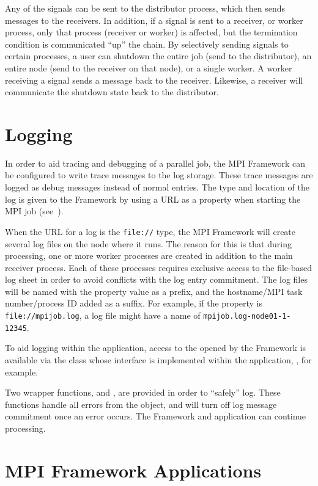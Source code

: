 Any of the signals can be sent to the distributor process, which then sends
messages to the receivers. In addition, if a signal is sent to a receiver, or
worker process, only that process (receiver or worker) is affected, but the
termination condition is communicated ``up'' the chain. By selectively sending
signals to certain processes, a user can shutdown the entire job (send to the
distributor), an entire node (send to the receiver on that node), or a single
worker. A worker receiving a signal sends a message back to the receiver.
Likewise, a receiver will communicate the shutdown state back to the
distributor.

\section{Logging}
\label{sec-mpilogging}
In order to aid tracing and debugging of a parallel job, the MPI Framework
can be configured to write trace messages to the log storage. These trace
messages are logged as debug messages instead of normal entries.
The type and location of the log is given to the 
Framework by using a URL as a property when starting the MPI
job (see~).

When the URL for a log is the {\tt file://} type, the MPI Framework will create
several log files on the node where it runs. The reason for this is that during
 processing, one or more worker processes are created in
addition to the main receiver process. Each of these processes requires
exclusive access to the file-based log sheet in order to avoid conflicts with
the log entry commitment.
The log files will be named with the property value
as a prefix, and the hostname/MPI task number/process ID added as a suffix.
For example, if the property is \verb=file://mpijob.log=, a log file might
have a name of \verb=mpijob.log-node01-1-12345=.

To aid logging within the application, access to the  opened
by the Framework is available via the class whose interface is implemented
within the application, , for example.

Two wrapper functions,  and ,
are provided in order to ``safely'' log. These functions handle all errors
from the  object, and will turn off log message commitment
once an error occurs. The Framework and application can continue processing.

\section{MPI Framework Applications}
\label{sec-mpiapp}

